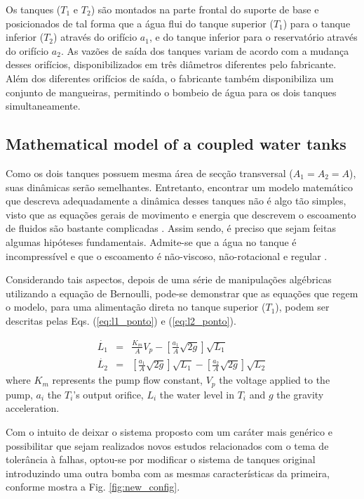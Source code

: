 \documentclass[10pt,fleqn,a4paper]{article}
\begin{document}
Os tanques ($T_1$ e $T_2$) são montados na parte frontal do suporte de base e
posicionados de tal forma que a água flui do tanque superior ($T_1$) para o
tanque inferior ($T_2$) através do orifício $a_1$, e do tanque inferior para o
reservatório através do orifício $a_2$. As vazões de saída dos tanques variam de
acordo com a mudança desses orifícios, disponibilizados em três diâmetros
diferentes pelo fabricante. Além dos diferentes orifícios de saída, o fabricante
também disponibiliza um conjunto de mangueiras, permitindo o bombeio de água
para os dois tanques simultaneamente.

\subsection{Mathematical model of a coupled water tanks} 
Como os dois tanques possuem mesma área de secção transversal ($A_1 = A_2 = A$),
suas dinâmicas serão semelhantes. Entretanto, encontrar um modelo matemático que
descreva adequadamente a dinâmica desses tanques não é algo tão simples, visto
que as equações gerais de movimento e energia que descrevem o escoamento de
fluidos são bastante complicadas . Assim sendo, é preciso que sejam feitas
algumas hipóteses fundamentais. Admite-se que a água no tanque é incompressível
e que o escoamento é não-viscoso, não-rotacional e regular \citep{dorf:2009}.

Considerando tais aspectos, depois de uma série de manipulações algébricas
utilizando a equação de Bernoulli, pode-se demonstrar que as equações que regem
o modelo, para uma alimentação direta no tanque superior ($T_1$), podem ser
descritas pelas Eqs.  (\ref{eq:l1_ponto}) e (\ref{eq:l2_ponto}).

\begin{eqnarray}
\dot{L_1} & = & \frac{K_m}{A}V_p -
                \left[\frac{a_1}{A}\sqrt{2g}\right]\sqrt{L_1}
                \label{eq:l1_ponto}\\
\dot{L_2} & = & \left[\frac{a_1}{A}\sqrt{2g}\right]\sqrt{L_1} -
                \left[\frac{a_2}{A}\sqrt{2g}\right]\sqrt{L_2}
                \label{eq:l2_ponto}
\end{eqnarray}
%
where $K_m$ represents the pump flow constant, $V_p$ the voltage applied to the
pump, $a_i$ the $T_i$'s output orifice, $L_i$ the water level in $T_i$ and $g$
the gravity acceleration.

Com o intuito de deixar o sistema proposto com um caráter mais genérico e
possibilitar que sejam realizados novos estudos relacionados com o tema de
tolerância à falhas, optou-se por modificar o sistema de tanques original
introduzindo uma outra bomba com as mesmas características da primeira, conforme
mostra a Fig. \ref{fig:new_config}.
\end{document}
